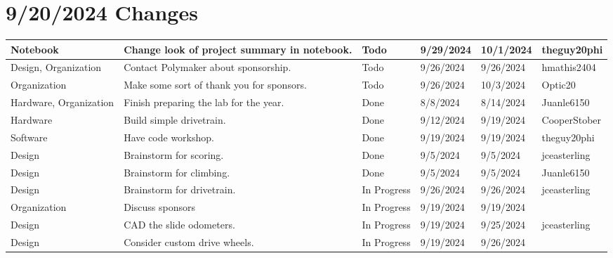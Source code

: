 \section{9/20/2024 Changes}
\begin{center}
\begin{longtable}{| p{40pt} | p{150pt} | p{35pt} | p{33pt} | p{33pt} | p{40pt} |}
\hline \rowcolor{IndianRed1}
Notebook & Change look of project summary in notebook. & Todo & 9/29/2024 & 10/1/2024 & theguy20phi \\
\hline \rowcolor{IndianRed1}
Design, Organization & Contact Polymaker about sponsorship. & Todo & 9/26/2024 & 9/26/2024 & hmathis2404 \\
\hline \rowcolor{IndianRed1}
Organization & Make some sort of thank you for sponsors. & Todo & 9/26/2024 & 10/3/2024 & Optic20 \\
\hline \rowcolor{DarkSeaGreen1}
Hardware, Organization & Finish preparing the lab for the year. & Done & 8/8/2024 & 8/14/2024 & Juanle6150 \\
\hline \rowcolor{DarkSeaGreen1}
Hardware & Build simple drivetrain. & Done & 9/12/2024 & 9/19/2024 & CooperStober \\
\hline \rowcolor{DarkSeaGreen1}
Software & Have code workshop. & Done & 9/19/2024 & 9/19/2024 & theguy20phi \\
\hline \rowcolor{DarkSeaGreen1}
Design & Brainstorm for scoring. & Done & 9/5/2024 & 9/5/2024 & jceasterling \\
\hline \rowcolor{DarkSeaGreen1}
Design & Brainstorm for climbing. & Done & 9/5/2024 & 9/5/2024 & Juanle6150 \\
\hline \rowcolor{LightGoldenrod1}
Design & Brainstorm for drivetrain. & In Progress & 9/26/2024 & 9/26/2024 & jceasterling \\
\hline \rowcolor{LightGoldenrod1}
Organization & Discuss sponsors & In Progress & 9/19/2024 & 9/19/2024 & \\
\hline \rowcolor{LightGoldenrod1}
Design & CAD the slide odometers. & In Progress & 9/19/2024 & 9/25/2024 & jceasterling \\
\hline \rowcolor{LightGoldenrod1}
Design & Consider custom drive wheels. & In Progress & 9/19/2024 & 9/26/2024 & \\
\hline
\end{longtable}
\end{center}


